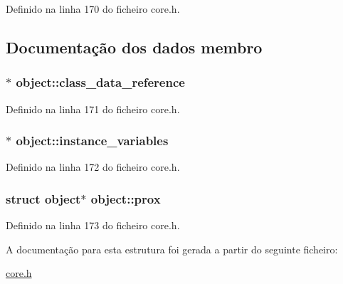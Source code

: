 Definido na linha 170 do ficheiro core.\-h.



\subsection{Documentação dos dados membro}
\hypertarget{structobject_af7136e313255a7d1efdcf775c9f6c412}{
\subsubsection[{class\-\_\-data\-\_\-reference}]{$\ast$ object\-::class\-\_\-data\-\_\-reference}}\label{structobject_af7136e313255a7d1efdcf775c9f6c412}


Definido na linha 171 do ficheiro core.\-h.

\hypertarget{structobject_ad02cb265ba006796debd79c5e22902d3}{
\subsubsection[{instance\-\_\-variables}]{$\ast$ object\-::instance\-\_\-variables}}\label{structobject_ad02cb265ba006796debd79c5e22902d3}


Definido na linha 172 do ficheiro core.\-h.

\hypertarget{structobject_adc7a300d54dbdc7f5a72f145b30ff3da}{
\subsubsection[{prox}]{\setlength{\rightskip}{0pt plus 5cm}struct {\bf object}$\ast$ object\-::prox}}\label{structobject_adc7a300d54dbdc7f5a72f145b30ff3da}


Definido na linha 173 do ficheiro core.\-h.



A documentação para esta estrutura foi gerada a partir do seguinte ficheiro\-:\begin{DoxyCompactItemize}
\item 
\hyperlink{core_8h}{core.\-h}\end{DoxyCompactItemize}
